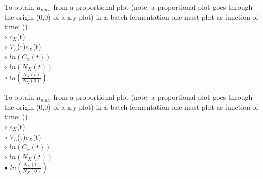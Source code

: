 \documentclass[]{beamer}
\begin{document}
\begin{frame}[shrink] {}
\color{blue}
To obtain $\mu$$_{max}$ from a proportional plot (note: a proportional plot goes through the origin (0,0) of a x,y plot) in a batch fermentation one must plot as function of time: ({\color{green}{Q10}})\\[0.5em]
\color{black}
\setlength{\parindent}{-0.4cm}
{\color{red}$\circ$} $c_{X}$(t)  \\[0.3em]
{\color{red}$\circ$} $V_{L}$(t)$c_{X}$(t)  \\[0.3em]
{\color{red}$\circ$} $ln(C_x(t))$  \\[0.3em]
{\color{red}$\circ$} $ln(N_X(t))$  \\[0.3em]
{\color{red}$\circ$} $ln(\frac{N_X(t)}{N_X(0)})$  \\[0.3em]
\end{frame}
\begin{frame}[shrink] {}
\color{blue}
To obtain $\mu$$_{max}$ from a proportional plot (note: a proportional plot goes through the origin (0,0) of a x,y plot) in a batch fermentation one must plot as function of time: ({\color{green}{Q10}})\\[0.5em]
\color{black}
\setlength{\parindent}{-0.4cm}
{\color{red}$\circ$} $c_{X}$(t)  \\[0.3em]
{\color{red}$\circ$} $V_{L}$(t)$c_{X}$(t)  \\[0.3em]
{\color{red}$\circ$} $ln(C_x(t))$  \\[0.3em]
{\color{red}$\circ$} $ln(N_X(t))$  \\[0.3em]
{\color{red}$\bullet$} $ln(\frac{N_X(t)}{N_X(0)})$  \\[0.3em]
\end{frame}
\end{document}
